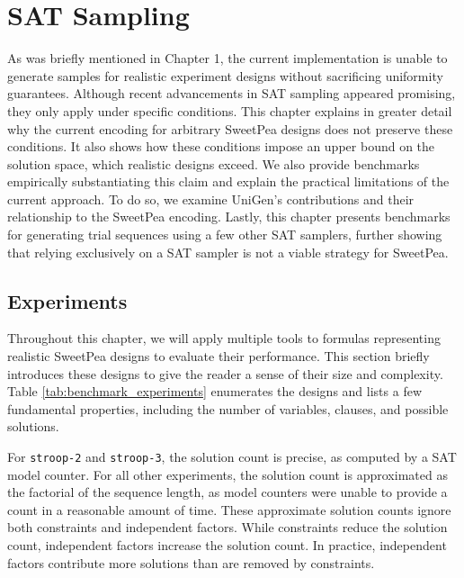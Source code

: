 
\chapter{SAT Sampling}

As was briefly mentioned in Chapter 1, the current implementation is unable to generate samples for realistic experiment designs without sacrificing uniformity guarantees. Although recent advancements in SAT sampling appeared promising, they only apply under specific conditions. This chapter explains in greater detail why the current encoding for arbitrary SweetPea designs does not preserve these conditions. It also shows how these conditions impose an upper bound on the solution space, which realistic designs exceed. We also provide benchmarks empirically substantiating this claim and explain the practical limitations of the current approach. To do so, we examine UniGen's contributions and their relationship to the SweetPea encoding. Lastly, this chapter presents benchmarks for generating trial sequences using a few other SAT samplers, further showing that relying exclusively on a SAT sampler is not a viable strategy for SweetPea.


\section{Experiments}

Throughout this chapter, we will apply multiple tools to formulas representing realistic SweetPea designs to evaluate their performance. This section briefly introduces these designs to give the reader a sense of their size and complexity. Table \ref{tab:benchmark_experiments} enumerates the designs and lists a few fundamental properties, including the number of variables, clauses, and possible solutions.

For \texttt{stroop-2} and \texttt{stroop-3}, the solution count is precise, as computed by a SAT model counter. For all other experiments, the solution count is approximated as the factorial of the sequence length, as model counters were unable to provide a count in a reasonable amount of time. These approximate solution counts ignore both constraints and independent factors. While constraints reduce the solution count, independent factors increase the solution count. In practice, independent factors contribute more solutions than are removed by constraints.

